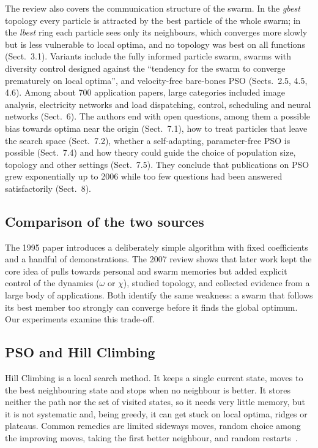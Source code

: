 \documentclass[11pt,a4paper]{article}
\newcommand{\tn}[1]{\textit{#1}}
\begin{document}
The review also covers the communication structure of the swarm. In the \tn{gbest} topology every particle is attracted by the best particle of the whole swarm; in the \tn{lbest} ring each particle sees only its neighbours, which converges more slowly but is less vulnerable to local optima, and no topology was best on all functions (Sect.~3.1). Variants include the fully informed particle swarm, swarms with diversity control designed against the ``tendency for the swarm to converge prematurely on local optima'', and velocity-free bare-bones PSO (Sects.~2.5, 4.5, 4.6). Among about 700 application papers, large categories included image analysis, electricity networks and load dispatching, control, scheduling and neural networks (Sect.~6). The authors end with open questions, among them a possible bias towards optima near the origin (Sect.~7.1), how to treat particles that leave the search space (Sect.~7.2), whether a self-adapting, parameter-free PSO is possible (Sect.~7.4) and how theory could guide the choice of population size, topology and other settings (Sect.~7.5). They conclude that publications on PSO grew exponentially up to 2006 while too few questions had been answered satisfactorily (Sect.~8).

\subsection{Comparison of the two sources}
The 1995 paper introduces a deliberately simple algorithm with fixed coefficients and a handful of demonstrations. The 2007 review shows that later work kept the core idea of pulls towards personal and swarm memories but added explicit control of the dynamics ($\omega$ or $\chi$), studied topology, and collected evidence from a large body of applications. Both identify the same weakness: a swarm that follows its best member too strongly can converge before it finds the global optimum. Our experiments examine this trade-off.

\subsection{PSO and Hill Climbing}
Hill Climbing is a local search method. It keeps a single current state, moves to the best neighbouring state and stops when no neighbour is better. It stores neither the path nor the set of visited states, so it needs very little memory, but it is not systematic and, being greedy, it can get stuck on local optima, ridges or plateaus. Common remedies are limited sideways moves, random choice among the improving moves, taking the first better neighbour, and random restarts~\cite[slides 4--12]{nguyen2025}.
\end{document}
